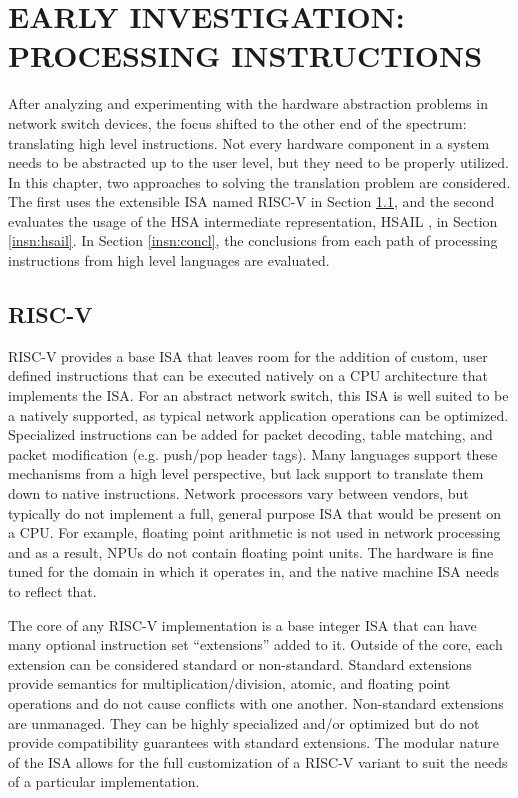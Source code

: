 \chapter{EARLY INVESTIGATION: PROCESSING INSTRUCTIONS}
\label{insn}
After analyzing and experimenting with the hardware abstraction problems in
network switch devices, the focus shifted to the other end of the spectrum:
translating high level instructions. Not every hardware component in a system
needs to be abstracted up to the user level, but they need to be properly
utilized. In this chapter, two approaches to solving the translation problem
are considered. The first uses the extensible ISA named RISC-V in Section
\ref{insn:riscv}, and the second evaluates the usage of the HSA intermediate
representation, HSAIL \cite{hsail}, in Section \ref{insn:hsail}. In Section
\ref{insn:concl}, the conclusions from each path of processing instructions
from high level languages are evaluated.

\section{RISC-V}
\label{insn:riscv}
RISC-V provides a base ISA that leaves room for the addition of custom, user
defined instructions that can be executed natively on a CPU architecture that
implements the ISA. For an abstract network switch, this ISA is well suited to
be a natively supported, as typical network application operations can be
optimized. Specialized instructions can be added for packet decoding, table
matching, and packet modification (e.g. push/pop header tags). Many languages
support these mechanisms from a high level perspective, but lack support to
translate them down to native instructions. Network processors vary between
vendors, but typically do not implement a full, general purpose ISA that would
be present on a CPU. For example, floating point arithmetic is not used in
network processing and as a result, NPUs do not contain floating point units.
The hardware is fine tuned for the domain in which it operates in, and the
native machine ISA needs to reflect that.

The core of any RISC-V implementation is a base integer ISA that can have many
optional instruction set ``extensions'' added to it. Outside of the core, each
extension can be considered standard or non-standard. Standard extensions
provide semantics for multiplication/division, atomic, and floating point
operations and do not cause conflicts with one another. Non-standard extensions
are unmanaged. They can be highly specialized and/or optimized but do not
provide compatibility guarantees with standard extensions. The modular nature
of the ISA allows for the full customization of a RISC-V variant to suit the
needs of a particular implementation.

